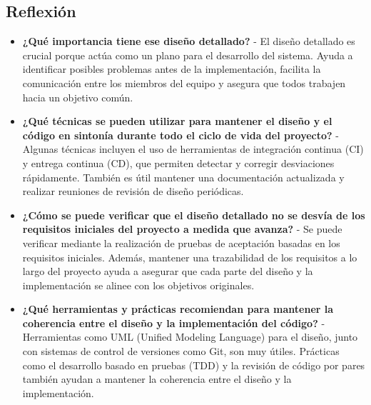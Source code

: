 \subsection*{Reflexión}
\begin{tcolorbox}[colback=gray!5!white,colframe=orange!60!gray,title=Preguntas]
\begin{itemize}
   \item \textbf{¿Qué importancia tiene ese diseño detallado?}
    - El diseño detallado es crucial porque actúa como un plano para el desarrollo del sistema. Ayuda a identificar posibles problemas antes de la implementación, facilita la comunicación entre los miembros del equipo y asegura que todos trabajen hacia un objetivo común.

\item \textbf{¿Qué técnicas se pueden utilizar para mantener el diseño y el código en sintonía durante todo el ciclo de vida del proyecto?}
    - Algunas técnicas incluyen el uso de herramientas de integración continua (CI) y entrega continua (CD), que permiten detectar y corregir desviaciones rápidamente. También es útil mantener una documentación actualizada y realizar reuniones de revisión de diseño periódicas.

\item \textbf{¿Cómo se puede verificar que el diseño detallado no se desvía de los requisitos iniciales del proyecto a medida que avanza?}
    - Se puede verificar mediante la realización de pruebas de aceptación basadas en los requisitos iniciales. Además, mantener una trazabilidad de los requisitos a lo largo del proyecto ayuda a asegurar que cada parte del diseño y la implementación se alinee con los objetivos originales.

\item \textbf{¿Qué herramientas y prácticas recomiendan para mantener la coherencia entre el diseño y la implementación del código?}
    - Herramientas como UML (Unified Modeling Language) para el diseño, junto con sistemas de control de versiones como Git, son muy útiles. Prácticas como el desarrollo basado en pruebas (TDD) y la revisión de código por pares también ayudan a mantener la coherencia entre el diseño y la implementación. 
\end{itemize}
\end{tcolorbox}
